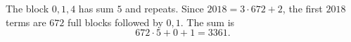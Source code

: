 The block $0,1,4$ has sum $5$ and repeats. Since $2018=3\cdot672+2$, the first $2018$ terms are $672$ full blocks followed by $0,1$. The sum is
\[
672\cdot5+0+1=\boxed{3361}.
\]
